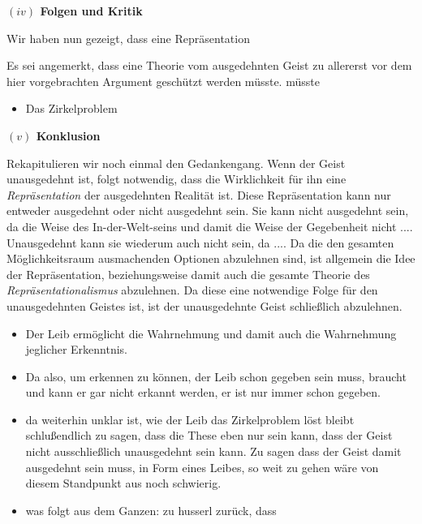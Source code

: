 \documentclass[a4paper, 12pt]{article}
\begin{document}
\begin{onehalfspace}



\vspace{5mm}
\noindent\textbf{$(iv)$ Folgen und Kritik}


\noindent Wir haben nun gezeigt, dass eine Repräsentation 


Es sei angemerkt, dass eine Theorie vom ausgedehnten Geist zu allererst vor dem hier vorgebrachten Argument geschützt werden müsste. müsste


\begin{itemize}
  \item Das Zirkelproblem
\end{itemize}



\vspace{5mm}
\noindent\textbf{$(v)$ Konklusion}

Rekapitulieren wir noch einmal den Gedankengang. Wenn der Geist unausgedehnt ist, folgt notwendig, dass die Wirklichkeit für ihn eine \emph{Repräsentation} der ausgedehnten Realität ist. Diese Repräsentation kann nur entweder ausgedehnt oder nicht ausgedehnt sein. Sie kann nicht ausgedehnt sein, da die Weise des In-der-Welt-seins und damit die Weise der Gegebenheit nicht .... Unausgedehnt kann sie wiederum auch nicht sein, da .... Da die den gesamten Möglichkeitsraum ausmachenden Optionen abzulehnen sind, ist allgemein die Idee der Repräsentation, beziehungsweise damit auch die gesamte Theorie des \emph{Repräsentationalismus} abzulehnen. Da diese eine notwendige Folge für den unausgedehnten Geistes ist, ist der unausgedehnte Geist schließlich abzulehnen.



\begin{itemize}
  \item Der Leib ermöglicht die Wahrnehmung und damit auch die Wahrnehmung jeglicher Erkenntnis.
  \item Da also, um erkennen zu können, der Leib schon gegeben sein muss, braucht und kann er gar nicht erkannt werden, er ist nur immer schon gegeben.
  \item da weiterhin unklar ist, wie der Leib das Zirkelproblem löst bleibt schlußendlich zu sagen, dass die These eben nur sein kann, dass der Geist nicht ausschließlich unausgedehnt sein kann. Zu sagen dass der Geist damit ausgedehnt sein muss, in Form eines Leibes, so weit zu gehen wäre von diesem Standpunkt aus noch schwierig.
  \item was folgt aus dem Ganzen: zu husserl zurück, dass 
\end{itemize}





\end{onehalfspace}
\end{document}
